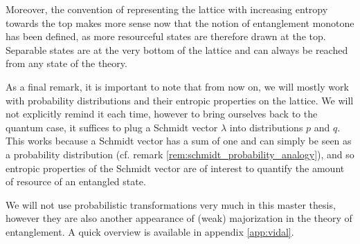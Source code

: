 Moreover, the convention of representing the lattice with increasing entropy towards the top makes more sense now that the notion of entanglement monotone has been defined, as more resourceful states are therefore drawn at the top. Separable states are at the very bottom of the lattice and can always be reached from any state of the theory.

As a final remark, it is important to note that from now on, we will mostly work with probability distributions and their entropic properties on the lattice. We will not explicitly remind it each time, however to bring ourselves back to the quantum case, it suffices to plug a Schmidt vector $\lambda$ into distributions $p$ and $q$. This works because a Schmidt vector has a sum of one and can simply be seen as a probability distribution (cf. remark \ref{rem:schmidt_probability_analogy}), and so entropic properties of the Schmidt vector are of interest to quantify the amount of resource of an entangled state.

We will not use probabilistic transformations very much in this master thesis, however they are also another appearance of (weak) majorization in the theory of entanglement. A quick overview is available in appendix \ref{app:vidal}.





